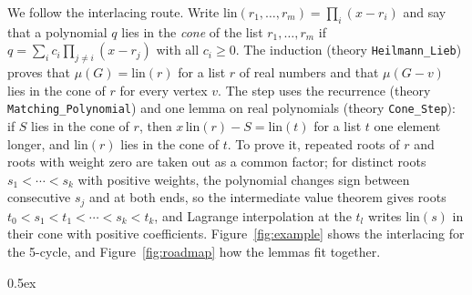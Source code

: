 \documentclass[10pt,a4paper]{article}
\begin{document}
We follow the interlacing route. Write $\mathrm{lin}(r_1, \ldots, r_m) = \prod_i (x - r_i)$ and say that a polynomial
$q$ lies in the \emph{cone} of the list $r_1, \ldots, r_m$ if $q = \sum_i c_i \prod_{j \neq i}(x - r_j)$ with all
$c_i \geq 0$. The induction (theory \texttt{Heilmann\_Lieb}) proves that $\mu(G) = \mathrm{lin}(r)$ for a list $r$
of real numbers and that $\mu(G - v)$ lies in the cone of $r$ for every vertex $v$. The step uses the recurrence
(theory \texttt{Matching\_Polynomial}) and one lemma on real polynomials (theory \texttt{Cone\_Step}): if $S$ lies in
the cone of $r$, then $x\,\mathrm{lin}(r) - S = \mathrm{lin}(t)$ for a list $t$ one element longer, and
$\mathrm{lin}(r)$ lies in the cone of $t$. To prove it, repeated roots of $r$ and roots with weight zero are taken
out as a common factor; for distinct roots $s_1 < \cdots < s_k$ with positive weights, the polynomial changes sign
between consecutive $s_j$ and at both ends, so the intermediate value theorem gives roots
$t_0 < s_1 < t_1 < \cdots < s_k < t_k$, and Lagrange interpolation at the $t_l$ writes $\mathrm{lin}(s)$ in their cone
with positive coefficients. Figure~\ref{fig:example} shows the interlacing for the 5-cycle, and
Figure~\ref{fig:roadmap} how the lemmas fit together.





\parindent 0pt\parskip 0.5ex





\end{document}

